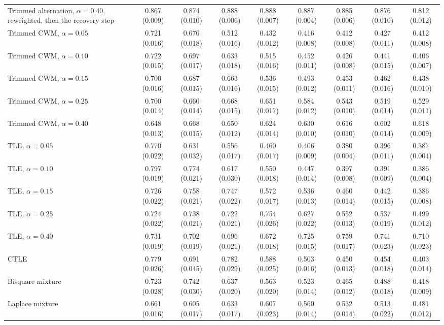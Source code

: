 \begin{table}[htbp]
{\begin{tabular}{lcccccccc}
Trimmed alternation, $\alpha=0.40$, reweighted, then the recovery step & 0.867 (0.009) & 0.874 (0.010) & 0.888 (0.006) & 0.888 (0.007) & 0.887 (0.004) & 0.885 (0.006) & 0.876 (0.010) & 0.812 (0.012) \\
Trimmed CWM, $\alpha=0.05$ & 0.721 (0.016) & 0.676 (0.018) & 0.512 (0.016) & 0.432 (0.012) & 0.416 (0.008) & 0.412 (0.008) & 0.427 (0.011) & 0.412 (0.008) \\
Trimmed CWM, $\alpha=0.10$ & 0.722 (0.015) & 0.697 (0.017) & 0.633 (0.018) & 0.515 (0.016) & 0.452 (0.011) & 0.426 (0.008) & 0.441 (0.015) & 0.406 (0.007) \\
Trimmed CWM, $\alpha=0.15$ & 0.700 (0.016) & 0.687 (0.015) & 0.663 (0.016) & 0.536 (0.015) & 0.493 (0.012) & 0.453 (0.011) & 0.462 (0.016) & 0.438 (0.010) \\
Trimmed CWM, $\alpha=0.25$ & 0.700 (0.014) & 0.660 (0.014) & 0.668 (0.015) & 0.651 (0.017) & 0.584 (0.012) & 0.543 (0.010) & 0.519 (0.014) & 0.529 (0.011) \\
Trimmed CWM, $\alpha=0.40$ & 0.648 (0.013) & 0.668 (0.015) & 0.650 (0.012) & 0.624 (0.014) & 0.630 (0.010) & 0.616 (0.010) & 0.602 (0.014) & 0.618 (0.009) \\
TLE, $\alpha=0.05$ & 0.770 (0.022) & 0.631 (0.032) & 0.556 (0.017) & 0.460 (0.017) & 0.406 (0.009) & 0.380 (0.004) & 0.396 (0.011) & 0.387 (0.004) \\
TLE, $\alpha=0.10$ & 0.797 (0.019) & 0.774 (0.021) & 0.617 (0.030) & 0.550 (0.018) & 0.447 (0.014) & 0.397 (0.008) & 0.391 (0.009) & 0.386 (0.004) \\
TLE, $\alpha=0.15$ & 0.726 (0.022) & 0.758 (0.021) & 0.747 (0.022) & 0.572 (0.017) & 0.536 (0.013) & 0.460 (0.014) & 0.442 (0.015) & 0.386 (0.008) \\
TLE, $\alpha=0.25$ & 0.724 (0.022) & 0.738 (0.021) & 0.722 (0.021) & 0.754 (0.026) & 0.627 (0.022) & 0.552 (0.013) & 0.537 (0.019) & 0.499 (0.012) \\
TLE, $\alpha=0.40$ & 0.731 (0.019) & 0.702 (0.019) & 0.696 (0.021) & 0.672 (0.018) & 0.725 (0.015) & 0.759 (0.017) & 0.741 (0.023) & 0.710 (0.023) \\
CTLE & 0.779 (0.026) & 0.691 (0.045) & 0.782 (0.029) & 0.588 (0.025) & 0.503 (0.016) & 0.450 (0.013) & 0.454 (0.018) & 0.403 (0.014) \\
Bisquare mixture & 0.723 (0.028) & 0.742 (0.030) & 0.637 (0.020) & 0.563 (0.020) & 0.523 (0.014) & 0.465 (0.012) & 0.488 (0.018) & 0.418 (0.009) \\
Laplace mixture & 0.661 (0.016) & 0.605 (0.017) & 0.633 (0.017) & 0.607 (0.023) & 0.560 (0.014) & 0.532 (0.014) & 0.513 (0.022) & 0.481 (0.012) \\

\end{tabular}}
\end{table}
